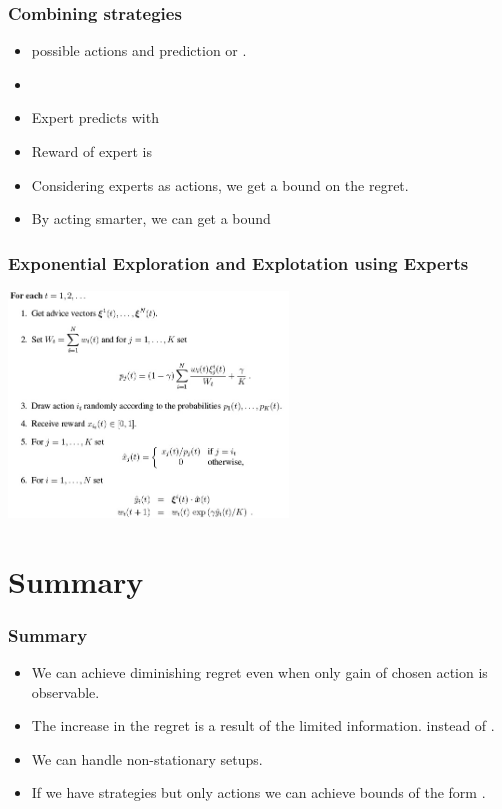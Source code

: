 \documentclass[handout]{beamer}
\begin{document}
\begin{frame}
\frametitle{Combining strategies}
\begin{itemize}
\item {} possible actions and  prediction  or .

\item {}
\item Expert  predicts with  
\item Reward of expert  is 
\item Considering experts as actions, we get a bound 
 on the regret.
\item By acting smarter, we can get a bound 
\end{itemize}
\end{frame}

\begin{frame}
\frametitle{Exponential Exploration and Explotation using Experts}
\includegraphics[height=6cm]{figures/Exp4.jpg}
\end{frame}

\section{Summary}

\begin{frame}
\frametitle{Summary}
\begin{itemize}
\item We can achieve diminishing regret even when only gain of chosen action is observable.
\item The increase in the regret is a result of the limited information. 
 instead of .
\item We can handle non-stationary setups.
\item If we have  strategies  but only  actions  we can achieve bounds of the form .
\end{itemize}
\end{frame}


%
\end{document}
